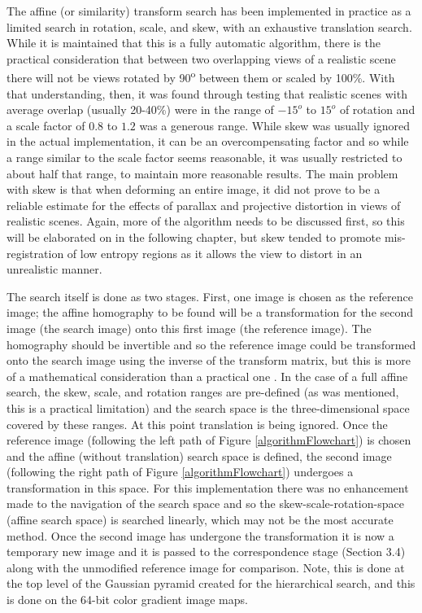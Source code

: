The affine (or similarity) transform search has been implemented in practice as a limited search in rotation, scale, and skew, with an exhaustive translation search. While it is maintained that this is a fully automatic algorithm, there is the practical consideration that between two overlapping views of a realistic scene there will not be views rotated by 90\textsuperscript{o} between them or scaled by 100\%. With that understanding, then, it was found through testing that realistic scenes with average overlap (usually 20-40\%) were in the range of $-15^{o}$ to $15^{o}$ of rotation and a scale factor of $0.8$ to $1.2$ was a generous range. While skew was usually ignored in the actual implementation, it can be an overcompensating factor and so while a range similar to the scale factor seems reasonable, it was usually restricted to about half that range, to maintain more reasonable results. The main problem with skew is that when deforming an entire image, it did not prove to be a reliable estimate for the effects of parallax and projective distortion in views of realistic scenes. Again, more of the algorithm needs to be discussed first, so this will be elaborated on in the following chapter, but skew tended to promote mis-registration of low entropy regions as it allows the view to distort in an unrealistic manner.

The search itself is done as two stages. First, one image is chosen as the reference image; the affine homography to be found will be a transformation for the second image (the search image) onto this first image (the reference image). The homography should be invertible and so the reference image could be transformed onto the search image using the inverse of the transform matrix, but this is more of a mathematical consideration than a practical one \cite{Hartley2003}. In the case of a full affine search, the skew, scale, and rotation ranges are pre-defined (as was mentioned, this is a practical limitation) and the search space is the three-dimensional space covered by these ranges. At this point translation is being ignored. Once the reference image (following the left path of Figure \ref{algorithmFlowchart}) is chosen and the affine (without translation) search space is defined, the second image (following the right path of Figure \ref{algorithmFlowchart}) undergoes a transformation in this space. For this implementation there was no enhancement made to the navigation of the search space and so the skew-scale-rotation-space (affine search space) is searched linearly, which may not be the most accurate method. Once the second image has undergone the transformation it is now a temporary new image and it is passed to the correspondence stage (Section 3.4) along with the unmodified reference image for comparison. Note, this is done at the top level of the Gaussian pyramid created for the hierarchical search, and this is done on the 64-bit color gradient image maps.


